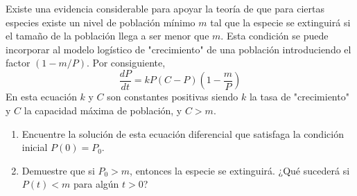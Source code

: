 \item Existe una evidencia considerable para apoyar la teoría de que para ciertas especies existe un nivel de población mínimo $m$ tal que la especie se extinguirá si el tamaño de la población llega a ser menor que $m$. Esta condición se puede incorporar al modelo logístico de "crecimiento" de una población introduciendo el factor $(1 - m/P)$. Por consiguiente,
    \[ \frac{dP}{dt} = kP(C - P)\left(1 - \frac{m}{P}\right) \]
    En esta ecuación $k$ y $C$ son constantes positivas siendo $k$ la tasa de "crecimiento" y $C$ la capacidad máxima de población, y $C > m$.
    \begin{enumerate}
        \item[(a)] Encuentre la solución de esta ecuación diferencial que satisfaga la condición inicial $P(0) = P_0$.
        \item[(b)] Demuestre que si $P_0 > m$, entonces la especie se extinguirá. ¿Qué sucederá si $P(t) < m$ para algún $t > 0$? 
    \end{enumerate}
